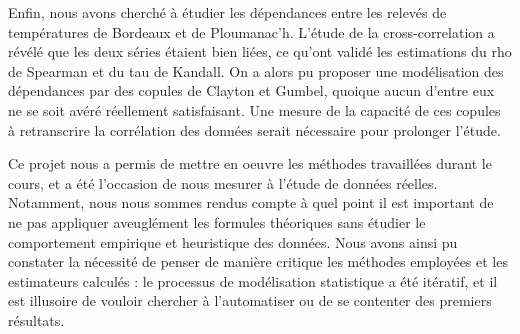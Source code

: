 \documentclass[../report.tex]{subfiles}
\begin{document}
\vspace{5mm}
\par Enfin, nous avons cherché à étudier les dépendances entre les relevés de températures de Bordeaux et de Ploumanac'h. L'étude de la cross-correlation a révélé que les deux séries étaient bien liées, ce qu'ont validé les estimations du rho de Spearman et du tau de Kandall. On a alors pu proposer une modélisation des dépendances par des copules de Clayton et Gumbel, quoique aucun d'entre eux ne se soit avéré réellement satisfaisant. Une mesure de la capacité de ces copules à retranscrire la corrélation des données serait nécessaire pour prolonger l'étude.

\vspace{7mm}
\par Ce projet nous a permis de mettre en oeuvre les méthodes travaillées durant le cours, et a été l'occasion de nous mesurer à l'étude de données réelles. Notamment, nous nous sommes rendus compte à quel point il est important de ne pas appliquer aveuglément les formules théoriques sans étudier le comportement empirique et heuristique des données. Nous avons ainsi pu constater la nécessité de penser de manière critique les méthodes employées et les estimateurs calculés : le processus de modélisation statistique a été itératif, et il est illusoire de vouloir chercher à l'automatiser ou de se contenter des premiers résultats.
\end{document}
